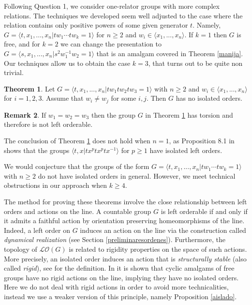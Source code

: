 \documentclass[12pt]{article}
\theoremstyle{definition}
\newtheorem{thm}{Theorem}[section]
\newtheorem{rem}[thm]{Remark}
\begin{document}
Following Question 1, we consider one-relator groups with more complex relations. The techniques we developed seem well adjusted to the case where the relation contains only positive powers of some given generator $t$. Namely, $G=\langle t,x_1,...,x_n|tw_1\cdots tw_k=1\rangle$ for $n\geq 2$ and $w_i\in\langle x_1,...,x_n\rangle$. If $k=1$ then $G$ is free, and for $k=2$ we can change the presentation to $G=\langle s,x_1,...,x_n| s^2w_1^{-1}w_2=1\rangle$ that is an amalgam covered in Theorem \ref{manija}. Our techniques allow us to obtain the case $k=3$, that turns out to be quite non trivial.

  
\begin{thm}\label{positiveword} Let $G=\langle t,x_1,...,x_n|tw_1tw_2tw_3=1\rangle$ with $n\geq 2$ and $w_i\in\langle x_1,...,x_n\rangle$ for $i=1,2,3$. Assume that $w_i\neq w_j$ for some $i,j$. Then $G$ has no isolated orders. 
\end{thm} 
\begin{rem} If $w_1=w_2=w_3$ then the group $G$ in Theorem \ref{positiveword} has torsion and therefore is not left orderable. 
\end{rem}

The conclusion of Theorem \ref{positiveword} does not hold when $n=1$, as Proposition 8.1 in \cite{dehornoy} shows that the groups $\langle t,x|tx^ptx^ptx^{-1}\rangle$ for $p\geq 1$ have isolated left orders.

We would conjecture that the groups of the form $G=\langle t,x_1,...,x_n|tw_1\cdots tw_k=1\rangle$ with $n\geq 2$ do not have isolated orders in general. However, we meet technical obstructions in our approach when $k\geq 4$.

The method for proving these theorems involve the close relationship between left orders and actions on the line. A countable group $G$ is left orderable if and only if it admits a faithful action by orientation preserving homeomorphisms of the line. Indeed, a left order on $G$ induces an action on the line via the construction called {\em dynamical realization} (see Section \ref{preliminaresordenes}). Furthermore, the topology of $\mathcal{LO}(G)$ is related to rigidity properties on the space of such actions. More precisely, an isolated order induces an action that is {\em structurally stable} (also called {\em rigid}), see \cite{abr} for the definition. In \cite{abr} it is shown that cyclic amalgams of free groups have no rigid actions on the line, implying they have no isolated orders. Here we do not deal with rigid actions in order to avoid more technicalities, instead we use a weaker version of this principle, namely Proposition \ref{aislado}.
\end{document}
